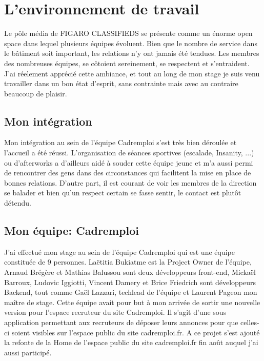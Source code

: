 \section{L'environnement de travail}
Le pôle média de FIGARO CLASSIFIEDS se présente comme un énorme open space dans lequel plusieurs équipes évoluent.
Bien que le nombre de service dans le bâtiment soit important, les relations n'y ont jamais été tendues.
Les membres des nombreuses équipes, se côtoient sereinement, se respectent et s'entraident.
J'ai réelement apprécié cette ambiance, et tout au long de mon stage je suis venu travailler dans un bon état d'esprit, sans contrainte mais avec au contraire beaucoup de plaisir.
\subsection{Mon intégration}
\label{sub:Mon intégration}
Mon intégration au sein de l'équipe Cadremploi s'est très bien déroulée et l'accueil a été réussi.
L'organisation de séances sportives (escalade, Insanity, ...) ou d'afterworks a d'ailleurs aidé à souder cette équipe jeune et m'a aussi permi de rencontrer des gens dans des circonstances qui facilitent la mise en place de bonnes relations.
D'autre part, il est courant de voir les membres de la direction se balader et bien qu'un respect certain se fasse sentir, le contact est plutôt détendu.
\subsection{Mon équipe: Cadremploi}
\label{sub:Mon équipe}
J'ai effectué mon stage au sein de l'équipe Cadremploi qui est une équipe constituée de 9 personnes. Laëtitia Bukiatme est la Project Owner de l'équipe, Arnaud Brégère et Mathias Balussou sont deux développeurs front-end, Mickaël Barroux, Ludovic Iggiotti, Vincent Damery et Brice Friedrich sont développeurs Backend, tout comme Gaël Lazzari, techlead de l'équipe et Laurent Pageon mon maître de stage.
Cette équipe avait pour but à mon arrivée de sortir une nouvelle version pour l'espace recruteur du site Cadremploi.
Il s'agit d'une sous application permettant aux recruteurs de déposer leurs annonces pour que celles-ci soient visibles sur l'espace public du site cadremploi.fr.
A ce projet s'est ajouté la refonte de la Home de l'espace public du site cadremploi.fr fin août auquel j'ai aussi participé.
